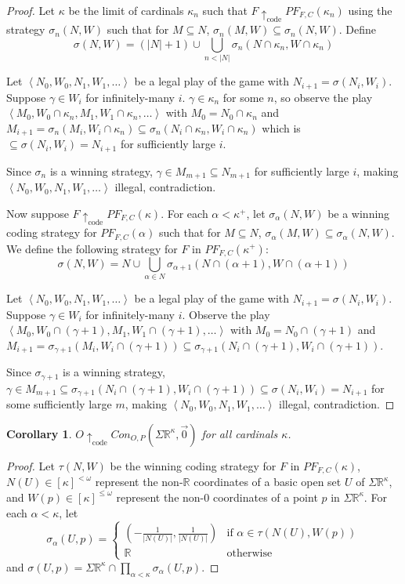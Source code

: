 \documentclass[11pt]{article}
\theoremstyle{plain}
\newtheorem{corollary}[theorem]{Corollary}
\theoremstyle{definition}
\theoremstyle{remark}
\newcommand{\codewin}{\uparrow_{\text{code}}}
\newcommand{\congame}[2]{Con_{O,P}(#1,#2)}
\newcommand{\pfgame}[1]{PF_{F,C}(#1)}
\newcommand{\sigmaprodr}[1]{\Sigma\mathbb{R}^{#1}}
\begin{document}
\begin{proof}
Let $\kappa$ be the limit of cardinals $\kappa_n$ such that $F\codewin\pfgame{\kappa_n}$ using the strategy $\sigma_n(N,W)$ such that for $M\subseteq N$, $\sigma_n(M,W)\subseteq\sigma_n(N,W)$. Define \[\sigma(N,W)=(|N|+1)\cup\bigcup_{n<|N|}\sigma_n(N\cap\kappa_n,W\cap\kappa_n)\]

Let $\left<N_0,W_0,N_1,W_1,\dots\right>$ be a legal play of the game with $N_{i+1}=\sigma(N_i,W_i)$. Suppose $\gamma\in W_i$ for infinitely-many $i$. $\gamma\in\kappa_n$ for some $n$, so observe the play $\left<M_0,W_0\cap\kappa_n,M_1,W_1\cap\kappa_n,\dots\right>$ with $M_0=N_0\cap\kappa_n$ and $M_{i+1}=\sigma_n(M_i,W_i\cap\kappa_n)\subseteq\sigma_n(N_i\cap\kappa_n,W_i\cap\kappa_n)$ which is $\subseteq\sigma(N_i,W_i)=N_{i+1}$ for sufficiently large $i$.

Since $\sigma_n$ is a winning strategy, $\gamma\in M_{m+1}\subseteq N_{m+1}$ for sufficiently large $i$, making $\left<N_0,W_0,N_1,W_1,\dots\right>$ illegal, contradiction.

Now suppose $F\codewin\pfgame{\kappa}$. For each $\alpha<\kappa^+$, let $\sigma_\alpha(N,W)$ be a winning coding strategy for $\pfgame{\alpha}$ such that for $M\subseteq N$, $\sigma_\alpha(M,W)\subseteq\sigma_\alpha(N,W)$. We define the following strategy for $F$ in $\pfgame{\kappa^+}$: \[\sigma(N,W)=N\cup\bigcup_{\alpha\in N}\sigma_{\alpha+1}(N\cap(\alpha+1),W\cap(\alpha+1))\]

Let $\left<N_0,W_0,N_1,W_1,\dots\right>$ be a legal play of the game with $N_{i+1}=\sigma(N_i,W_i)$. Suppose $\gamma\in W_i$ for infinitely-many $i$. Observe the play $\left<M_0,W_0\cap(\gamma+1),M_1,W_1\cap(\gamma+1),\dots\right>$ with $M_0=N_0\cap(\gamma+1)$ and $M_{i+1}=\sigma_{\gamma+1}(M_i,W_i\cap(\gamma+1))\subseteq\sigma_{\gamma+1}(N_i\cap(\gamma+1),W_i\cap(\gamma+1))$.

Since $\sigma_{\gamma+1}$ is a winning strategy, $\gamma\in M_{m+1}\subseteq\sigma_{\gamma+1}(N_i\cap(\gamma+1),W_i\cap(\gamma+1))\subseteq\sigma(N_i,W_i)=N_{i+1}$ for some sufficiently large $m$, making $\left<N_0,W_0,N_1,W_1,\dots\right>$ illegal, contradiction.
\end{proof}

\begin{corollary}
$O\codewin\congame{\sigmaprodr{\kappa}}{\vec{0}}$ for all cardinals $\kappa$.
\end{corollary}

\begin{proof}
Let $\tau(N,W)$ be the winning coding strategy for $F$ in $\pfgame{\kappa}$, $N(U)\in[\kappa]^{<\omega}$ represent the non-$\mathbb{R}$ coordinates of a basic open set $U$ of $\sigmaprodr{\kappa}$, and $W(p)\in[\kappa]^{\leq\omega}$ represent the non-$0$ coordinates of a point $p$ in $\sigmaprodr{\kappa}$. For each $\alpha<\kappa$, let \[\sigma_\alpha(U,p)=\left\{\begin{array}{ll}(-\frac{1}{|N(U)|},\frac{1}{|N(U)|})&\text{if }\alpha\in\tau(N(U),W(p))\\\mathbb{R}&\text{otherwise}\end{array}\right.\] and $\sigma(U,p)=\sigmaprodr{\kappa}\cap\prod_{\alpha<\kappa}\sigma_\alpha(U,p)$.
\end{proof}
\end{document}
